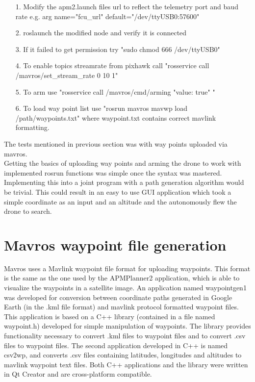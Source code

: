 \begin{itemize}

\item[1.] Modify the apm2.launch files url to reflect the telemetry port and baud rate e.g. arg
name="fcu\_url" default="/dev/ttyUSB0:57600"
\item[2.] roslaunch the modified node and verify it is connected
\item[3.] If it failed to get permission try "sudo chmod 666 /dev/ttyUSB0"
\item[4.] To enable topics streamrate from pixhawk call "rosservice call /mavros/set\_stream\_rate 0
10 1"
\item[5.] To arm use "rosservice call /mavros/cmd/arming "value: true" "
\item[6.] To load way point list use "rosrun mavros mavwp load /path/waypoints.txt" where
waypoint.txt contains correct mavlink formatting.

\end{itemize}

The tests mentioned in previous section was with way points uploaded via mavros.\\
Getting the basics of uploading way points and arming the drone to work with implemented rosrun
functions was simple once the syntax was mastered. Implementing this into a joint program with a
path generation algorithm would be trivial. This could result in an easy to use GUI application
which took a simple coordinate as an input and an altitude and the autonomously flew the drone to
search.\\

\section{Mavros waypoint file generation}
Mavros uses a Mavlink waypoint file format for uploading waypoints.
This format is the same as the one used by the APMPlanner2 application,
which is able to visualize the waypoints in a satellite image.
An application named waypointgen1 was developed for conversion between coordinate paths generated in
Google Earth (in the .kml file format)
and mavlink protocol formatted waypoint files. This application is based on a C++ library (contained
in a file named waypoint.h)
developed for simple manipulation of waypoints. The library provides functionality necessary to
convert .kml files to waypoint files
and to convert .csv files to waypoint files.
The second application developed in C++ is named csv2wp, and converts .csv files containing
latitudes, longitudes and altitudes to mavlink waypoint text files.
Both C++ applications and the library were written in Qt Creator and are cross-platform compatible.

